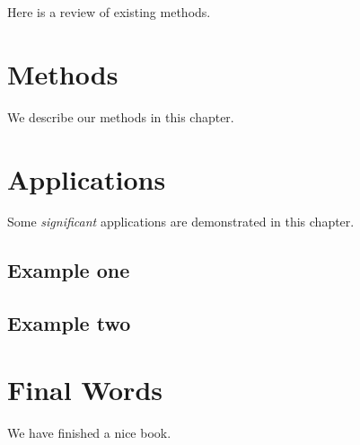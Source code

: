 \documentclass[
]{book}
\begin{document}
Here is a review of existing methods.

\hypertarget{methods}{%
\chapter{Methods}\label{methods}}

We describe our methods in this chapter.

\hypertarget{applications}{%
\chapter{Applications}\label{applications}}

Some \emph{significant} applications are demonstrated in this chapter.

\hypertarget{example-one}{%
\section{Example one}\label{example-one}}

\hypertarget{example-two}{%
\section{Example two}\label{example-two}}

\hypertarget{final-words}{%
\chapter{Final Words}\label{final-words}}

We have finished a nice book.
\end{document}

